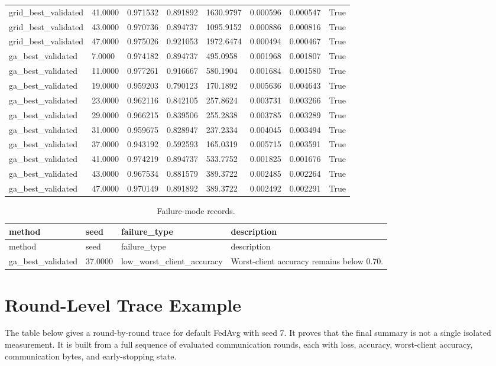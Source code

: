 \documentclass[11pt]{report}
\begin{document}
\begin{longtable}{llllllll}
grid\_best\_validated & 41.0000 & 0.971532 & 0.891892 & 1630.9797 & 0.000596 & 0.000547 & True \\
grid\_best\_validated & 43.0000 & 0.970736 & 0.894737 & 1095.9152 & 0.000886 & 0.000816 & True \\
grid\_best\_validated & 47.0000 & 0.975026 & 0.921053 & 1972.6474 & 0.000494 & 0.000467 & True \\
ga\_best\_validated & 7.0000 & 0.974182 & 0.894737 & 495.0958 & 0.001968 & 0.001807 & True \\
ga\_best\_validated & 11.0000 & 0.977261 & 0.916667 & 580.1904 & 0.001684 & 0.001580 & True \\
ga\_best\_validated & 19.0000 & 0.959203 & 0.790123 & 170.1892 & 0.005636 & 0.004643 & True \\
ga\_best\_validated & 23.0000 & 0.962116 & 0.842105 & 257.8624 & 0.003731 & 0.003266 & True \\
ga\_best\_validated & 29.0000 & 0.966215 & 0.839506 & 255.2838 & 0.003785 & 0.003289 & True \\
ga\_best\_validated & 31.0000 & 0.959675 & 0.828947 & 237.2334 & 0.004045 & 0.003494 & True \\
ga\_best\_validated & 37.0000 & 0.943192 & 0.592593 & 165.0319 & 0.005715 & 0.003591 & True \\
ga\_best\_validated & 41.0000 & 0.974219 & 0.894737 & 533.7752 & 0.001825 & 0.001676 & True \\
ga\_best\_validated & 43.0000 & 0.967534 & 0.881579 & 389.3722 & 0.002485 & 0.002264 & True \\
ga\_best\_validated & 47.0000 & 0.970149 & 0.891892 & 389.3722 & 0.002492 & 0.002291 & True \\
\bottomrule
\end{longtable}
\begin{longtable}{llll}
\caption{Failure-mode records.}\\
\toprule
method & seed & failure\_type & description \\
\midrule
\endfirsthead
\toprule
method & seed & failure\_type & description \\
\midrule
\endhead
ga\_best\_validated & 37.0000 & low\_worst\_client\_accuracy & Worst-client accuracy remains below 0.70. \\
\bottomrule
\end{longtable}
\chapter{Round-Level Trace Example}
The table below gives a round-by-round trace for default FedAvg with seed 7. It proves that the
final summary is not a single isolated measurement. It is built from a full sequence of evaluated
communication rounds, each with loss, accuracy, worst-client accuracy, communication bytes, and
early-stopping state.
\end{document}
